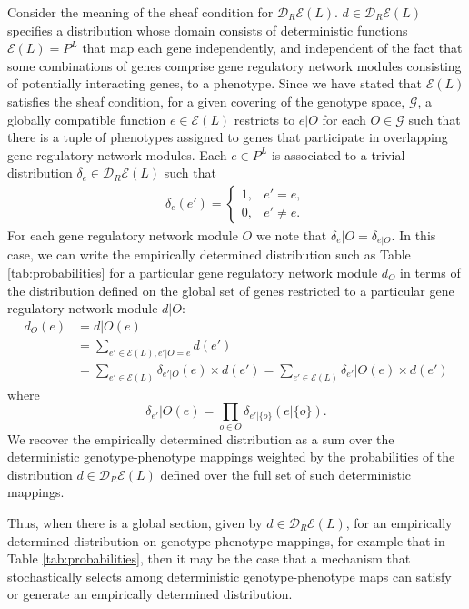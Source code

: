 Consider the meaning of the sheaf condition for $\mathcal{D}_R\mathcal{E}(L)$. $d \in \mathcal{D}_R\mathcal{E}(L)$ specifies a distribution whose domain consists of deterministic functions $\mathcal{E}(L) = P^L$ that map each gene independently, and independent of the fact that some combinations of genes  comprise gene regulatory network modules consisting of potentially interacting genes, to a phenotype. Since we have stated that $\mathcal{E}(L)$ satisfies the sheaf condition, for a given covering of the genotype space, $\mathcal{G}$, a globally compatible function $e \in  \mathcal{E}(L)$ restricts to $e|O$ for each $O \in \mathcal{G}$ such that there is a tuple of phenotypes assigned to genes that participate in overlapping gene regulatory network modules. Each $e \in P^L$ is associated to a trivial distribution $\delta_e \in \mathcal{D}_R\mathcal{E}(L)$ such that
\begin{eqnarray}
\delta_e(e') =
\begin{cases}
1, & e' = e,\\
0, & e' \neq e.
\end{cases}
\end{eqnarray}
For each gene regulatory network module $O$ we note that $\delta_e|O = \delta_{e|O}$. In this case, we can write the empirically determined distribution such as Table \ref{tab:probabilities} for a particular gene regulatory network module $d_O$ in terms of the distribution defined on the global set of genes restricted to a particular gene regulatory network module $d|O$:
\begin{equation}\label{eq:factordist}
\begin{split}
d_O(e) &= d|O(e)\\
&= \sum_{e' \in \mathcal{E}(L),e'|O=e} d(e')\\
&= \sum_{e' \in \mathcal{E}(L)} \delta_{e'|O}(e) \times d(e') = \sum_{e' \in \mathcal{E}(L)} \delta_{e'}|O(e) \times d(e')
\end{split}
\end{equation}
where
\begin{equation*}
\delta_{e'}|O(e) = \prod_{o \in O} \delta_{e'|\{o\}}(e|\{o\}).
\end{equation*}
We recover the empirically determined distribution as a sum over the deterministic genotype-phenotype mappings weighted by the probabilities of the distribution $d \in \mathcal{D}_R\mathcal{E}(L)$ defined over the full set of such deterministic mappings.

Thus, when there is a global section, given by $d \in \mathcal{D}_R\mathcal{E}(L)$, for an empirically determined distribution on genotype-phenotype mappings, for example that in Table \ref{tab:probabilities}, then it may be the case that a mechanism that stochastically selects among deterministic genotype-phenotype maps can satisfy or generate an empirically determined distribution.

